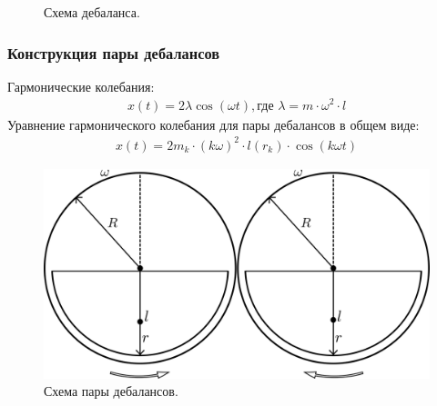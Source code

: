 \documentclass[10pt, pdf, hyperref={unicode}]{beamer}
\begin{document}
\begin{frame}
\begin{center}
\begin{minipage}[h]{0.97\linewidth}
\begin{minipage}[h]{0.36\linewidth}
\begin{figure}[h]
                        \caption{Схема дебаланса.}
                    \end{figure}
                \end{minipage}
            \end{minipage}
        \end{center}
    \end{frame}


    \begin{frame}
        \frametitle{Конструкция пары дебалансов}
        \begin{center}
            \begin{minipage}[h]{0.97\linewidth}
                Гармонические колебания:
                \begin{equation}
                    \begin{gathered}
                        x(t) = 2 \lambda \cos (\omega t), \textrm{где } \lambda = m \cdot \omega^2 \cdot l
                    \end{gathered}
                \end{equation}
                Уравнение гармонического колебания для пары дебалансов в общем виде:
                \begin{equation}
                    \begin{aligned}
                        x(t) = 2 m_k \cdot (k \omega)^2 \cdot l(r_k) \cdot \cos (k \omega t)
                    \end{aligned}
                \end{equation}
                \begin{figure}[h]
                    \centering
                    \includegraphics[width=0.52\linewidth]{../img/double_debalance.png}
                    \caption{Схема пары дебалансов.}
                \end{figure}
            \end{minipage}
        \end{center}
    \end{frame}
\end{document}
